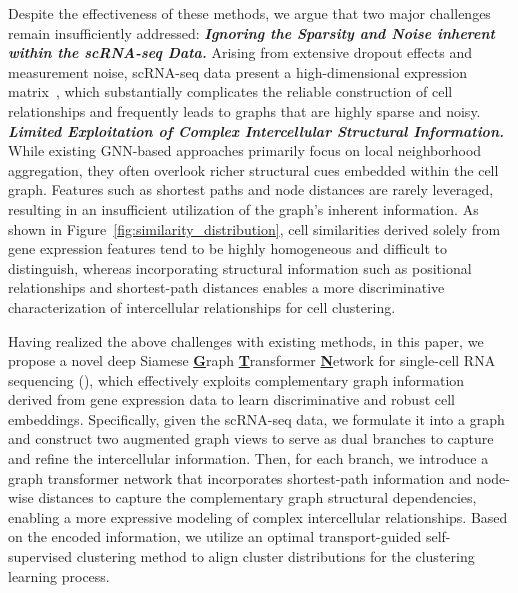 Despite the effectiveness of these methods, we argue that two major challenges remain insufficiently addressed: \circlefir{} \textbf{\textit{Ignoring the Sparsity and Noise inherent within the scRNA-seq Data.}} Arising from extensive dropout effects and measurement noise, scRNA-seq data present a high-dimensional expression matrix~\cite {ou2022matrix,wu2022network}, which substantially complicates the reliable construction of cell relationships and frequently leads to graphs that are highly sparse and noisy. \circlesec{} \textbf{\textit{Limited Exploitation of Complex Intercellular Structural Information.}} While existing GNN-based approaches primarily focus on local neighborhood aggregation, they often overlook richer structural cues embedded within the cell graph. Features such as shortest paths and node distances are rarely leveraged, resulting in an insufficient utilization of the graph’s inherent information. As shown in Figure~\ref{fig:similarity_distribution}, cell similarities derived solely from gene expression features tend to be highly homogeneous and difficult to distinguish, whereas incorporating structural information such as positional relationships and shortest-path distances enables a more discriminative characterization of intercellular relationships for cell clustering.   

Having realized the above challenges with existing methods, in this paper, we propose a novel deep Siamese \underline{\textbf{G}}raph \underline{\textbf{T}}ransformer \underline{\textbf{N}}etwork for single-cell RNA sequencing (\textbf{\method{}}), which effectively exploits complementary graph information derived from gene expression data to learn discriminative and robust cell embeddings. Specifically, given the scRNA-seq data, we formulate it into a graph and construct two augmented graph views to serve as dual branches to capture and refine the intercellular information. Then, for each branch, we introduce a graph transformer network that incorporates shortest-path information and node-wise distances to capture the complementary graph structural dependencies, enabling a more expressive modeling of complex intercellular relationships. Based on the encoded information, we utilize an optimal transport-guided self-supervised clustering method to align cluster distributions for the clustering learning process.   

